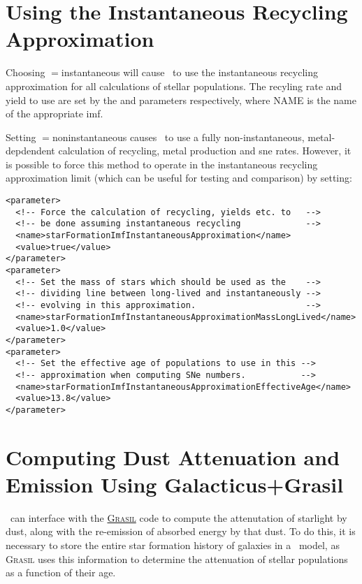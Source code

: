 \section{Using the Instantaneous Recycling Approximation}

Choosing {\normalfont \ttfamily [stellarPopulationPropertiesMethod]}$=${\normalfont \ttfamily instantaneous} will cause \glc\ to use the instantaneous recycling approximation for all calculations of stellar populations. The recyling rate and yield to use are set by the {\normalfont \ttfamily [imfNAMERecycledInstantaneous]} and {\normalfont \ttfamily [imfNAMEYieldInstantaneous]} parameters respectively, where {\normalfont \ttfamily NAME} is the name of the appropriate \gls{imf}.

Setting {\normalfont \ttfamily [stellarPopulationPropertiesMethod]}$=${\normalfont \ttfamily noninstantaneous} causes \glc\ to use a fully non-instantaneous, metal-depdendent calculation of recycling, metal production and \gls{sne} rates. However, it is possible to force this method to operate in the instantaneous recycling approximation limit (which can be useful for testing and comparison) by setting:
\begin{verbatim}
<parameter>
  <!-- Force the calculation of recycling, yields etc. to   -->
  <!-- be done assuming instantaneous recycling             -->
  <name>starFormationImfInstantaneousApproximation</name>
  <value>true</value>
</parameter>
<parameter>
  <!-- Set the mass of stars which should be used as the    -->
  <!-- dividing line between long-lived and instantaneously -->
  <!-- evolving in this approximation.                      -->
  <name>starFormationImfInstantaneousApproximationMassLongLived</name>
  <value>1.0</value>
</parameter>
<parameter>
  <!-- Set the effective age of populations to use in this -->
  <!-- approximation when computing SNe numbers.           -->
  <name>starFormationImfInstantaneousApproximationEffectiveAge</name>
  <value>13.8</value>
</parameter>
\end{verbatim}

\section{Computing Dust Attenuation and Emission Using Galacticus+Grasil}\label{sec:TutorialGrasil}

\glc\ can interface with the \href{http://adlibitum.oat.ts.astro.it/silva/grasil/grasil.html}{\normalfont \scshape Grasil} code to compute the attenutation of starlight by dust, along with the re-emission of absorbed energy by that dust. To do this, it is necessary to store the entire star formation history of galaxies in a \glc\ model, as {\normalfont \scshape Grasil} uses this information to determine the attenuation of stellar populations as a function of their age.


